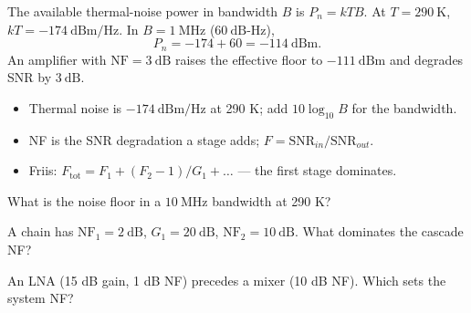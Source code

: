 \begin{workedexample}
The available thermal-noise power in bandwidth $B$ is $P_n = kTB$. At
$T = 290\ \text{K}$, $kT = -174\ \text{dBm/Hz}$. In $B = 1\ \text{MHz}$
($60\ \text{dB-Hz}$),
\[ P_n = -174 + 60 = -114\ \text{dBm}. \]
An amplifier with $\text{NF} = 3\ \text{dB}$ raises the effective floor to
$-111\ \text{dBm}$ and degrades SNR by $3\ \text{dB}$.
\end{workedexample}

\begin{keytakeaways}
\begin{itemize}[leftmargin=1.4em,itemsep=2pt]
\item Thermal noise is $-174\ \text{dBm/Hz}$ at 290 K; add $10\log_{10}B$ for the bandwidth.
\item NF is the SNR degradation a stage adds; $F = \text{SNR}_{in}/\text{SNR}_{out}$.
\item Friis: $F_{\text{tot}} = F_1 + (F_2-1)/G_1 + \dots$ --- the first stage dominates.
\end{itemize}
\end{keytakeaways}

\begin{exercises}
\item What is the noise floor in a $10\ \text{MHz}$ bandwidth at 290 K?
\item A chain has $\text{NF}_1 = 2\ \text{dB}$, $G_1 = 20\ \text{dB}$, $\text{NF}_2 = 10\ \text{dB}$. What dominates the cascade NF?
\item An LNA (15 dB gain, 1 dB NF) precedes a mixer (10 dB NF). Which sets the system NF?
\end{exercises}

